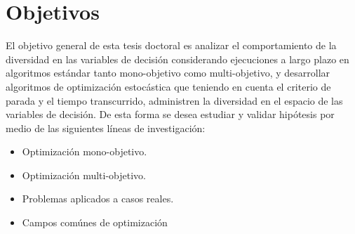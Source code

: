 \section{Objetivos}

El objetivo general de esta tesis doctoral es analizar el comportamiento de la diversidad en las variables de decisión considerando ejecuciones a largo plazo en algoritmos estándar tanto mono-objetivo como multi-objetivo, y desarrollar algoritmos de optimización estocástica que teniendo en cuenta el criterio de parada y el tiempo transcurrido, administren la diversidad en el espacio de las variables de decisión.
%
De esta forma se desea estudiar y validar hipótesis por medio de las siguientes líneas de investigación:
\begin{itemize}
    \item Optimización mono-objetivo.
    \item Optimización multi-objetivo.
    \item Problemas aplicados a casos reales.
    \item Campos comúnes de optimización
\end{itemize}
